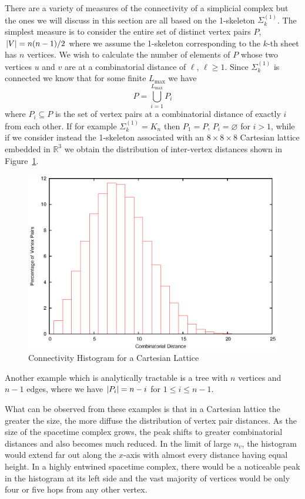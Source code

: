 \documentclass[12pt,letterpaper]{report}
\begin{document}
There are a variety of measures of the connectivity of a simplicial complex but the ones we will discuss 
in this section are all based on the 1-skeleton $\Sigma_k^{(1)}$. The simplest measure is to consider the 
entire set of distinct vertex pairs $P$, $\left\lvert V\right\rvert = n(n-1)/2$ where we assume the 1-skeleton corresponding 
to the $k$-th sheet has $n$ vertices. We wish to calculate the number of elements of $P$ whose two vertices 
$u$ and $v$ are at a combinatorial distance of $\ell$, $\ell\ge 1$. Since $\Sigma_k^{(1)}$ is connected we 
know that for some finite $L_\text{max}$ we have 
\begin{equation}
P = \bigcup_{i=1}^{L_\text{max}} P_i 
\end{equation} 
where $P_i\subseteq P$ is the set of vertex pairs at a combinatorial distance of exactly $i$ from each other.
If for example $\Sigma_k^{(1)} = K_n$ then $P_1 = P$, $P_i = \varnothing$ for $i > 1$, while if we consider 
instead the 1-skeleton associated with an $8\times 8\times 8$ Cartesian lattice embedded in $\mathbb{R}^3$ 
we obtain the distribution of inter-vertex distances shown in Figure~\ref{histogram}.
\begin{figure}[htb]
\centering
\includegraphics[width=5in]{images/connectivity_histogram.eps} 
\caption{Connectivity Histogram for a Cartesian Lattice}
\label{histogram}
\end{figure}
Another example which is analytically tractable is a tree with $n$ vertices and $n-1$ edges, where we have 
$\left\lvert P_i\right\rvert = n-i$ for $1\le i\le n-1$. 

What can be observed from these examples is that in a Cartesian lattice the greater the size, the more diffuse  
the distribution of vertex pair distances. As the size of the spacetime complex grows, the peak shifts to greater 
combinatorial distances and also becomes much reduced. In the limit of large $n_v$, the histogram would extend 
far out along the $x$-axis with almost every distance having equal height. In a highly entwined spacetime complex, 
there would be a noticeable peak in the histogram at its left side and the vast majority of vertices would be 
only four or five hops from any other vertex.  
\end{document}
